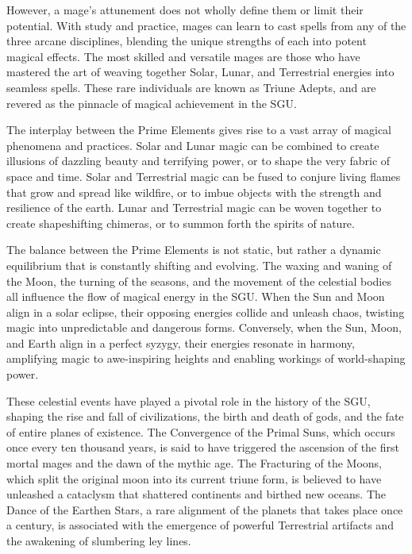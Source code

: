 \documentclass[12pt]{article}
\begin{document}
However, a mage's attunement does not wholly define them or limit their potential. With study and practice, mages can learn to cast spells from any of the three arcane disciplines, blending the unique strengths of each into potent magical effects. The most skilled and versatile mages are those who have mastered the art of weaving together Solar, Lunar, and Terrestrial energies into seamless spells. These rare individuals are known as Triune Adepts, and are revered as the pinnacle of magical achievement in the SGU.

The interplay between the Prime Elements gives rise to a vast array of magical phenomena and practices. Solar and Lunar magic can be combined to create illusions of dazzling beauty and terrifying power, or to shape the very fabric of space and time. Solar and Terrestrial magic can be fused to conjure living flames that grow and spread like wildfire, or to imbue objects with the strength and resilience of the earth. Lunar and Terrestrial magic can be woven together to create shapeshifting chimeras, or to summon forth the spirits of nature.

The balance between the Prime Elements is not static, but rather a dynamic equilibrium that is constantly shifting and evolving. The waxing and waning of the Moon, the turning of the seasons, and the movement of the celestial bodies all influence the flow of magical energy in the SGU. When the Sun and Moon align in a solar eclipse, their opposing energies collide and unleash chaos, twisting magic into unpredictable and dangerous forms. Conversely, when the Sun, Moon, and Earth align in a perfect syzygy, their energies resonate in harmony, amplifying magic to awe-inspiring heights and enabling workings of world-shaping power.

These celestial events have played a pivotal role in the history of the SGU, shaping the rise and fall of civilizations, the birth and death of gods, and the fate of entire planes of existence. The Convergence of the Primal Suns, which occurs once every ten thousand years, is said to have triggered the ascension of the first mortal mages and the dawn of the mythic age. The Fracturing of the Moons, which split the original moon into its current triune form, is believed to have unleashed a cataclysm that shattered continents and birthed new oceans. The Dance of the Earthen Stars, a rare alignment of the planets that takes place once a century, is associated with the emergence of powerful Terrestrial artifacts and the awakening of slumbering ley lines.
\end{document}
